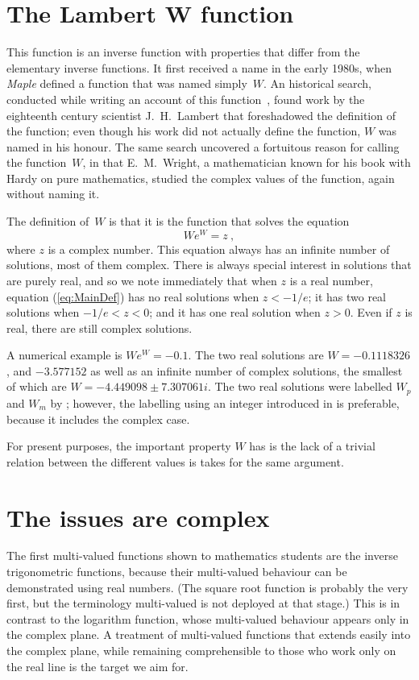 \documentclass{article}
\begin{document}
\section{The Lambert W function}
This function is an inverse function with properties that differ from the elementary
inverse functions.
It first received a name in the early 1980s, when \textsl{Maple}
defined a function that was named simply~$W$.
An historical search, conducted while writing an account of
this function~\cite{LambertW:1996}, found work by the eighteenth century
scientist J.~H.~Lambert that foreshadowed the definition of the function;
even though his work did not actually define the function, $W$ was
named in his honour.
The same search uncovered a fortuitous reason for calling the function~$W$,
in that E.~M.~Wright, a mathematician known for his book with Hardy on pure
mathematics, studied the complex values of the function, again without naming
it.

The definition of~$W$ is that it is the function that solves the equation
\begin{equation} \label{eq:MainDef}
W e^W =z\ ,
\end{equation}
where $z$ is a complex number.
This equation always has an infinite number of solutions, most of them complex.
There is always special interest in solutions that are purely real,
and so we note immediately that when
$z$ is a real number, equation (\ref{eq:MainDef}) has
no real solutions when $z<-1/e$; it has two real solutions when $-1/e<z<0$; and it has
one real solution when $z>0$.
Even if $z$ is real, there are still complex solutions.

A numerical example is $W e^W=-0.1$. The two real solutions are
$W=-0.1118326$, and $-3.577152$ as well as an infinite number of complex solutions,
the smallest of which are $W=-4.449098\pm 7.307061i$. The two real solutions were
labelled $W_p$ and $W_m$ by \cite{Barry:1995:RVW}; however, the labelling using an integer
introduced in \cite{LambertW:1996} is preferable, because it includes the complex case.

For present purposes, the important property $W$ has is the lack of a trivial relation
between the different values is takes for the same argument.

\section{The issues are complex}
The first multi-valued functions shown to mathematics students
are the inverse trigonometric functions,
because their multi-valued behaviour can be demonstrated using real numbers.
(The square root function is probably the very first, but the terminology
multi-valued is not deployed at that stage.)
This is in contrast to the logarithm function, whose multi-valued behaviour
appears only in the complex plane.
A treatment of multi-valued functions that extends easily into the complex plane, while
remaining comprehensible to those who work only on the real line is the target we aim for.
\end{document}
